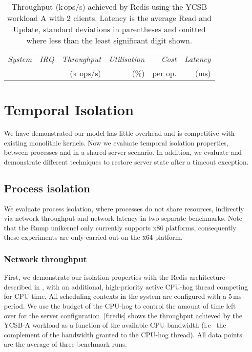 \begin{table}[t]\centering
      \begin{tabularx}{\textwidth}{Xrrrrr}\toprule
          \emph{System}   & \emph{IRQ} & \emph{Throughput} & \emph{Utilisation} & \emph{Cost} & \emph{Latency} \\
                          &            & (k ops/s)         & (\%)               & per op.     & (ms)            \\
        \midrule

      
      \bottomrule
    \end{tabularx}
    \caption[Results of Redis throughput benchmark.]{Throughput (k\,ops/s) achieved by Redis using the YCSB
      workload A with 2 clients.  Latency is the average Read and Update,
      standard deviations in parentheses and omitted where less than the least
      significant digit shown.}
    \label{t:redis}
\end{table}

\section{Temporal Isolation}

We have demonstrated our model has little overhead and is competitive with existing monolithic
kernels. Now we evaluate temporal isolation properties, between processes and in a shared-server
scenario. 
In addition, we evaluate and demonstrate different
techniques to restore server state after a timeout exception.

\subsection{Process isolation} 

We evaluate process isolation, where processes do not share resources, indirectly via network
throughput and network latency in two separate benchmarks. Note that the Rump unikernel only
currently supports x86 platforms, consequently these experiments are only carried out on
the \textsc{x64} platform. 

\subsubsection{Network throughput}

First, we demonstrate our isolation properties with the Redis architecture described in
, with an additional, high-priority active CPU-hog thread
competing for \gls{CPU} time.  All scheduling contexts in the system are configured with a
5\,ms period. We use the budget of the CPU-hog to control the amount of time left over
for the server configuration. \autoref{f:redis} shows the throughput
achieved by the YCSB-A workload as a function of the available CPU
bandwidth (i.e \ the complement of the bandwidth granted to the CPU-hog
thread). All data points are the average of three benchmark runs.

